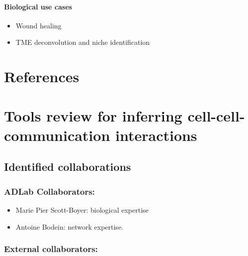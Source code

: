 \documentclass[
  letterpaper,
]{book}
\providecommand{\tightlist}{%
  \setlength{\itemsep}{0pt}\setlength{\parskip}{0pt}}\usepackage{longtable,booktabs,array}
\begin{document}
\subsubsection{Biological use cases}\label{biological-use-cases}

\begin{itemize}
\tightlist
\item
  Wound healing
\item
  TME deconvolution and niche identification
\end{itemize}

\cleardoublepage
{}
{}
\appendix

\chapter*{References}\label{references}


\printbibliography[heading=none]

\chapter{Tools review for inferring cell-cell-communication
interactions}\label{tools-review-for-inferring-cell-cell-communication-interactions}

\section{Identified collaborations}\label{identified-collaborations}

\subsection{ADLab Collaborators:}\label{adlab-collaborators}

\begin{itemize}
\tightlist
\item
  Marie Pier Scott-Boyer: biological expertise
\item
  Antoine Bodein: network expertise.
\end{itemize}

\subsection{External collaborators:}\label{external-collaborators}
\end{document}
